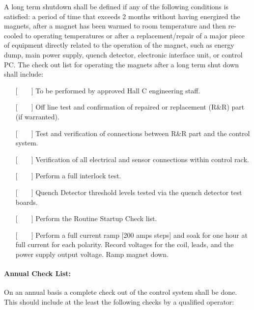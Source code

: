 {A long term shutdown shall be defined if any of the following
conditions is satisfied: a period of time that exceeds 2 months without
having energized the magnets, after a magnet has been warmed to room
temperature and then re-cooled to operating temperatures or after a
replacement/repair of a major piece of equipment directly related to the
operation of the magnet, such as energy dump, main power supply, quench
detector, electronic interface unit, or control PC.  The check out list for
operating the magnets after a long term shut down shall include:

\begin{itemize}
\item[{[~~~~]}] {To be performed by approved Hall C engineering staff.}
\item[{[~~~~]}] {Off line test and confirmation of repaired or
replacement (R\&R) part (if warranted).}
\item[{[~~~~]}] {Test and verification of connections between R\&R
part and the control system.}
\item[{[~~~~]}] {Verification of all electrical and sensor
connections within control rack.}
\item[{[~~~~]}] {Perform a full interlock test.}
\item[{[~~~~]}] {Quench Detector threshold levels tested via the
quench detector test boards.}
\item[{[~~~~]}] {Perform the Routine Startup Check list.}
\item[{[~~~~]}] {Perform a full current ramp [200 amps steps] and
soak for one hour
at full current for each polarity. Record voltages for the coil, leads, and
the power supply output voltage. Ramp magnet down.}
\end{itemize}

\vspace{0.5in}
\hspace*{3.5in}{\underline{~~~~~~~~~~~~~~~~~~~~~~~~~~~~~~~~~}}
\newline
\hspace*{3.5in}{Signature~~~~~~~~~~~~Date}

\newpage
\paragraph{Annual Check List:}

On an annual basis a complete check out of the control system
shall be done. This should include at the least the following checks by a
qualified operator:

}
